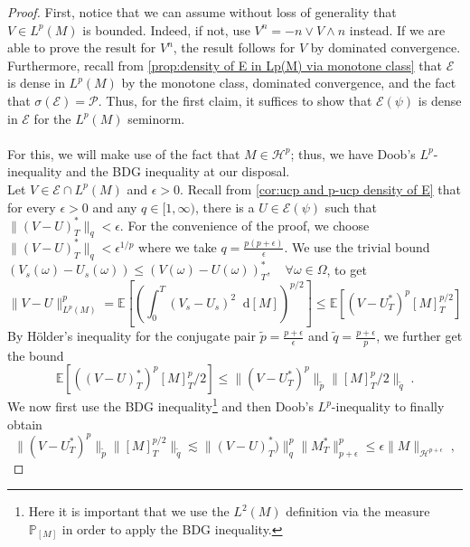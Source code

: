 \documentclass[11pt]{report}
\newcommand{\diff}{\mathop{}\!\mathrm{d}}
\theoremstyle{plain} %
\theoremstyle{definition} %
\theoremstyle{remark} %
\begin{document}
\begin{proof}
 First, notice that we can assume without loss of generality that \(V\in L^p(M)\) is bounded. Indeed, if not, use \(V^n=-n\vee V\wedge n\) instead. If we are able to prove the result for \(V^n\), the result follows for \(V\) by dominated convergence. \\
    Furthermore, recall from \cref{prop:density of E in Lp(M) via monotone class} that \(\mathcal{E}\) is dense in \(L^p(M)\) by the monotone class, dominated convergence, and the fact that \(\sigma(\mathcal{E})=\mathcal{P}\). Thus, for the first claim, it suffices to show that \(\mathcal{E}(\psi)\) is dense in \(\mathcal{E}\) for the \(L^p(M)\) seminorm. \\\\
 For this, we will make use of the fact that \(M\in\mathcal{H}^p\); thus, we have Doob's \(L^p\)-inequality and the BDG inequality at our disposal.
 \\ Let \(V\in\mathcal{E}\cap L^p(M)\) and  \(\epsilon>0\).
    Recall from \cref{cor:ucp and p-ucp density of E} that for every \(\epsilon>0\) and any \(q\in[1,\infty)\), there is a \(U\in\mathcal{E}(\psi)\) such that \(\lVert (V-U)^*_{T}\rVert_{q}<\epsilon\). For the convenience of the proof, we choose \(\lVert (V-U)^*_{T}\rVert_{q}<\epsilon^{1/p}\) where we take \(q=\frac{p(p+\epsilon)}{\epsilon}\). We use the trivial bound \((V_s(\omega)-U_s(\omega))\leq(V(\omega)-U(\omega))_{T}^*,\quad\forall\omega\in\Omega\), to get 
    \begin{equation}
        \rVert V-U\lVert_{L^p(M)}^p=\mathbb{E}[\left(\int_{0}^{T}(V_s-U_s)^2\diff[M]\right)^{p/2}]\leq\mathbb{E}[(V-U_{T}^*)^p[M]_{T}^{p/2}]
    \end{equation}
 By Hölder's inequality for the conjugate pair \(\tilde{p}=\frac{p+\epsilon}{\epsilon}\) and \(\tilde{q}=\frac{p+\epsilon}{p}\), we further get the bound
    \begin{equation}
        \mathbb{E}[((V-U)
        _{T}^*)^p[M]_{T}^p/2]\leq\lVert(V-U_{T}^*)^p\rVert_{\tilde{p}}\lVert[M]_{T}^p/2 \rVert_{\tilde{q}}\;.
    \end{equation}
    We now first use the BDG inequality\footnote{Here it is important that we use the \(L^2(M)\) definition via the measure \(\mathbb{P}_{[M]}\) in order to apply the BDG inequality.} and then Doob's \(L^p\)-inequality to finally obtain
    \begin{equation}
        \lVert(V-U_{T}^*)^p\rVert_{\tilde{p}}\lVert[M]_{T}^{p/2} \rVert_{\tilde{q}}\lesssim \lVert(V-U)_{T}^*)\rVert_{q}^p\lVert M^*_{T}\rVert_{p+\epsilon}^p\leq\epsilon\lVert M\rVert_{\mathcal{H}^{p+\epsilon}}\;,

\end{equation}
\end{proof}
\end{document}

